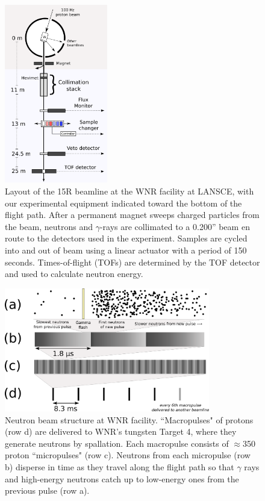 \begin{figure}[ht]
    \centering
    \includegraphics[width=0.4\textwidth]{figures/ExperimentalSetup.png}
    \caption[Layout of the 15R beamline at the WNR facility at LANSCE]
        {Layout of the 15R beamline at the WNR facility at LANSCE, with our
    experimental equipment indicated toward the bottom of the flight path.
    After a permanent magnet sweeps charged particles from the beam, neutrons and
    $\gamma$-rays are collimated to a 0.200'' beam en route to the
    detectors used in the experiment. Samples are cycled into and out of beam
    using a linear actuator with a period of 150 seconds. Times-of-flight (TOFs) are
    determined by the TOF detector and used to calculate neutron energy.
}
    \label{ExperimentalApparatus}
\end{figure}

\begin{figure}[h]
    \centering
    \includegraphics[width=0.8\textwidth]{figures/beamStructure.png}
    \caption[Pulsed structure of the neutron beam at the WNR facility]
    {
        Neutron beam structure at WNR facility.
        ``Macropulses" of protons (row d) are delivered to
        WNR's tungsten Target 4, where they generate neutrons by spallation.
        Each macropulse consists of
        $\approx$350 proton ``micropulses" (row c). Neutrons
        from each micropulse (row b) disperse in
        time as they travel along the flight path so that $\gamma$ rays and high-energy 
        neutrons catch up to low-energy ones from the previous pulse (row a).
    }
    \label{BeamStructure}
\end{figure}


